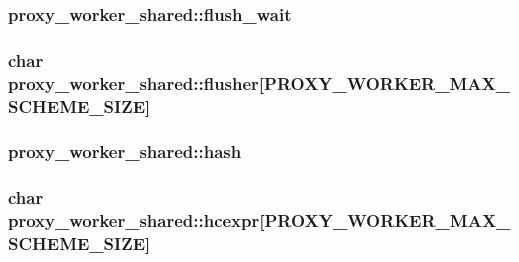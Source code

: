 \subsubsection[{\texorpdfstring{flush\+\_\+wait}{flush_wait}}]{ proxy\+\_\+worker\+\_\+shared\+::flush\+\_\+wait}\hypertarget{structproxy__worker__shared_a306a5fb867912b526cddea722cd7f012}{}\label{structproxy__worker__shared_a306a5fb867912b526cddea722cd7f012}
\subsubsection[{\texorpdfstring{flusher}{flusher}}]{\setlength{\rightskip}{0pt plus 5cm}char proxy\+\_\+worker\+\_\+shared\+::flusher\mbox{[}{\bf P\+R\+O\+X\+Y\+\_\+\+W\+O\+R\+K\+E\+R\+\_\+\+M\+A\+X\+\_\+\+S\+C\+H\+E\+M\+E\+\_\+\+S\+I\+ZE}\mbox{]}}\hypertarget{structproxy__worker__shared_a3090ca65efabd91a661c4cce2403228f}{}\label{structproxy__worker__shared_a3090ca65efabd91a661c4cce2403228f}
\subsubsection[{\texorpdfstring{hash}{hash}}]{ proxy\+\_\+worker\+\_\+shared\+::hash}\hypertarget{structproxy__worker__shared_aade40e2000e67a4cd33f6015336da649}{}\label{structproxy__worker__shared_aade40e2000e67a4cd33f6015336da649}
\subsubsection[{\texorpdfstring{hcexpr}{hcexpr}}]{\setlength{\rightskip}{0pt plus 5cm}char proxy\+\_\+worker\+\_\+shared\+::hcexpr\mbox{[}{\bf P\+R\+O\+X\+Y\+\_\+\+W\+O\+R\+K\+E\+R\+\_\+\+M\+A\+X\+\_\+\+S\+C\+H\+E\+M\+E\+\_\+\+S\+I\+ZE}\mbox{]}}\hypertarget{structproxy__worker__shared_aa5528297a17f3a4109d80e0ae408da16}{}\label{structproxy__worker__shared_aa5528297a17f3a4109d80e0ae408da16}
